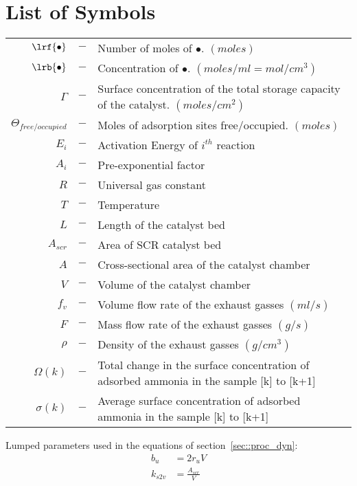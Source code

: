\section*{List of Symbols}

\begin{table}[H]
    \begin{tabular}{r c l}
        $\lrf{\bullet}$ &$-$& Number of moles of $\bullet$. $(moles)$\\
        $\lrb{\bullet}$ &$-$& Concentration of $\bullet$. $(moles/ml = mol/cm^3)$\\
        $\Gamma$ &$-$& Surface concentration of the total storage capacity of the catalyst. $(moles/cm^2)$\\
        $\Theta_{free/occupied}$ &$-$& Moles of adsorption sites free/occupied. $(moles)$\\
        $E_i$ &$-$& Activation Energy of $i^{th}$ reaction\\
        $A_i$ &$-$& Pre-exponential factor\\
        $R$ &$-$& Universal gas constant\\
        $T$ &$-$& Temperature\\
        $L$ &$-$& Length of the catalyst bed\\
        $A_{scr}$ &$-$& Area of SCR catalyst bed\\
        $A$ &$-$& Cross-sectional area of the catalyst chamber\\
        $V$ &$-$& Volume of the catalyst chamber\\
        $f_v$ &$-$& Volume flow rate of the exhaust gasses $(ml/s)$\\
        $F$ &$-$& Mass flow rate of the exhaust gasses $(g/s)$\\
        $\rho$ &$-$& Density of the exhaust gasses $(g/cm^3)$\\
        $\Omega(k)$ &$-$& Total change in the surface concentration of
        adsorbed ammonia in the sample [k] to [k+1]\\
$\sigma(k)$ &$-$& Average surface concentration of adsorbed ammonia in the
sample [k] to [k+1]\\
    \end{tabular}
\end{table}

Lumped parameters used in the equations of section~\ref{sec::proc_dyn}:
\begin{align*}
    b_u &= 2r_u V\\
    k_{s2v} &= \frac{A_{scr}}{V}\\
\end{align*}
